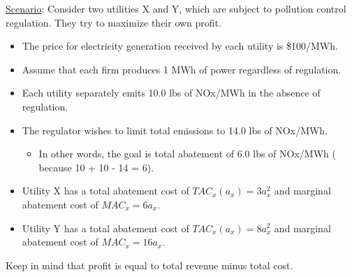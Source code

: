\documentclass[11pt]{article}
\begin{document}
\noindent
\underline{Scenario}: Consider two utilities X and Y, which are subject to pollution control regulation. They try to maximize their own profit.

\begin{itemize}
    \item The price for electricity generation received by each utility is \$100/MWh.
    \item Assume that each firm produces 1 MWh of power regardless of regulation.
    \item Each utility separately emits 10.0 lbs of NOx/MWh in the absence of regulation.
    \item The regulator wishes to limit total emissions to 14.0 lbs of NOx/MWh.
    \begin{itemize}
        \item In other words, the goal is total abatement of 6.0 lbs of NOx/MWh ( because 10 + 10 - 14 = 6).
    \end{itemize}

    \item Utility X has a total abatement cost of $TAC_x(a_x) = 3a_x^2$ and marginal abatement cost of $MAC_x = 6a_x$.

    \item Utility Y has a total abatement cost of $TAC_x(a_x) = 8a_x^2$ and marginal abatement cost of $MAC_x = 16a_x$.
\end{itemize}

Keep in mind that profit is equal to total revenue minus total cost.
\end{document}
